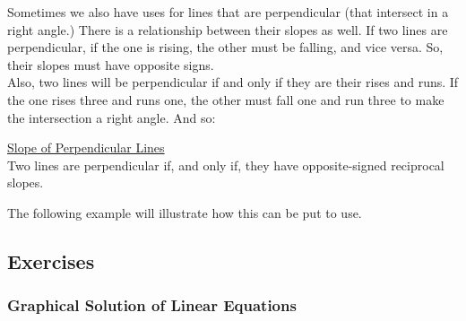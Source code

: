 \bigskip

Sometimes we also have uses for lines that are perpendicular (that intersect in a right angle.) There is a relationship between their slopes as well. If two lines are perpendicular, if the one is rising, the other must be falling, and vice versa. So, their slopes must have opposite signs.\\

Also, two lines will be perpendicular if and only if they are  their rises and runs. If the one rises three and runs one, the other must fall one and run three to make the intersection a right angle. And so:

\begin{definition}
	\underline{Slope of Perpendicular Lines}\\
	\bigskip
	Two lines are perpendicular if, and only if, they have opposite-signed reciprocal slopes.
\end{definition}

The following example will illustrate how this can be put to use.



%
%

\clearpage
\subsection{Exercises}

\subsubsection*{Graphical Solution of Linear Equations}

